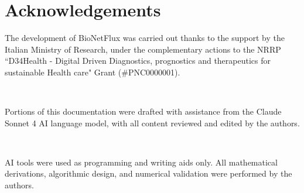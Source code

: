 \section*{Acknowledgements}

The development of BioNetFlux was carried out thanks to the support by the Italian Ministry of Research, under the complementary actions to the NRRP ``D34Health - Digital Driven Diagnostics, prognostics and therapeutics for sustainable Health care" Grant (\#PNC0000001).

\

Portions of this documentation were drafted with assistance from the Claude Sonnet 4 AI language model, with all content reviewed and edited by the authors.

\

AI tools were used as programming and writing aids only. All mathematical derivations,
algorithmic design, and numerical validation were performed by the authors.
\clearpage
